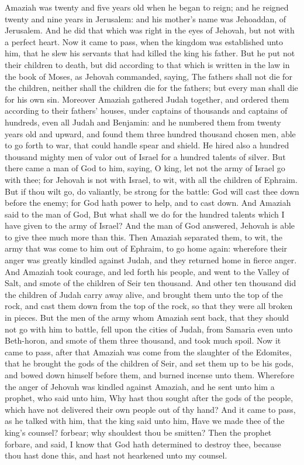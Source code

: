 Amaziah was twenty and five years old when he began to reign; and he reigned twenty and nine years in Jerusalem: and his mother’s name was Jehoaddan, of Jerusalem. And he did that which was right in the eyes of Jehovah, but not with a perfect heart. Now it came to pass, when the kingdom was established unto him, that he slew his servants that had killed the king his father. But he put not their children to death, but did according to that which is written in the law in the book of Moses, as Jehovah commanded, saying, The fathers shall not die for the children, neither shall the children die for the fathers; but every man shall die for his own sin.  Moreover Amaziah gathered Judah together, and ordered them according to their fathers’ houses, under captains of thousands and captains of hundreds, even all Judah and Benjamin: and he numbered them from twenty years old and upward, and found them three hundred thousand chosen men, able to go forth to war, that could handle spear and shield. He hired also a hundred thousand mighty men of valor out of Israel for a hundred talents of silver. But there came a man of God to him, saying, O king, let not the army of Israel go with thee; for Jehovah is not with Israel, to wit, with all the children of Ephraim. But if thou wilt go, do valiantly, be strong for the battle: God will cast thee down before the enemy; for God hath power to help, and to cast down. And Amaziah said to the man of God, But what shall we do for the hundred talents which I have given to the army of Israel? And the man of God answered, Jehovah is able to give thee much more than this. Then Amaziah separated them, to wit, the army that was come to him out of Ephraim, to go home again: wherefore their anger was greatly kindled against Judah, and they returned home in fierce anger. And Amaziah took courage, and led forth his people, and went to the Valley of Salt, and smote of the children of Seir ten thousand. And other ten thousand did the children of Judah carry away alive, and brought them unto the top of the rock, and cast them down from the top of the rock, so that they were all broken in pieces. But the men of the army whom Amaziah sent back, that they should not go with him to battle, fell upon the cities of Judah, from Samaria even unto Beth-horon, and smote of them three thousand, and took much spoil.  Now it came to pass, after that Amaziah was come from the slaughter of the Edomites, that he brought the gods of the children of Seir, and set them up to be his gods, and bowed down himself before them, and burned incense unto them. Wherefore the anger of Jehovah was kindled against Amaziah, and he sent unto him a prophet, who said unto him, Why hast thou sought after the gods of the people, which have not delivered their own people out of thy hand? And it came to pass, as he talked with him, that the king said unto him, Have we made thee of the king’s counsel? forbear; why shouldest thou be smitten? Then the prophet forbare, and said, I know that God hath determined to destroy thee, because thou hast done this, and hast not hearkened unto my counsel.  